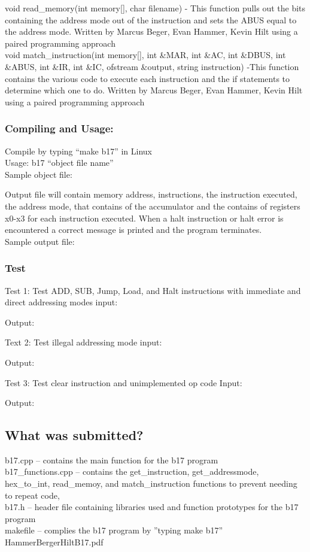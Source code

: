 \documentclass[11pt]{article}
\begin{document}
void read\_memory(int memory[],  char\* filename) - This function pulls out the bits containing the address mode out of the  instruction and sets the ABUS equal to the address mode. Written by Marcus Beger, Evan Hammer, Kevin Hilt using a paired programming approach\\

void match\_instruction(int memory[], int \&MAR, int \&AC, int \&DBUS,  int \&ABUS, int \&IR, int \&IC,  ofstream \&output, string instruction) -This function contains the various code to execute each instruction and the if statements to determine which one to do. Written by Marcus Beger, Evan Hammer, Kevin Hilt using a paired programming approach\\

\subsubsection{Compiling and Usage:}
Compile by typing “make b17” in Linux\\
Usage: b17 “object file name”\\
Sample object file:

Output file will contain memory address, instructions, the instruction executed, the address mode, that contains of the accumulator and the contains of registers x0-x3 for each instruction executed. When a halt instruction or halt error is encountered a correct message is printed and the program terminates. \\
Sample output file:


\subsubsection{Test}
Test 1: Test  ADD, SUB, Jump, Load, and Halt instructions with immediate and direct addressing modes
input:

Output:

Text 2: Test illegal addressing mode
input:

Output:

Test 3: Test clear instruction and unimplemented op code
Input:

Output:


\subsection{What was submitted?}
b17.cpp – contains the main function for the b17 program\\
b17\_functions.cpp – contains the get\_instruction, get\_addressmode, hex\_to\_int, read\_memoy, and match\_instruction functions to prevent needing to repeat code,\\
b17.h – header file containing libraries used and function prototypes for the b17 program\\
makefile – complies the b17 program by ''typing make b17''\\
HammerBergerHiltB17.pdf
\end{document}
